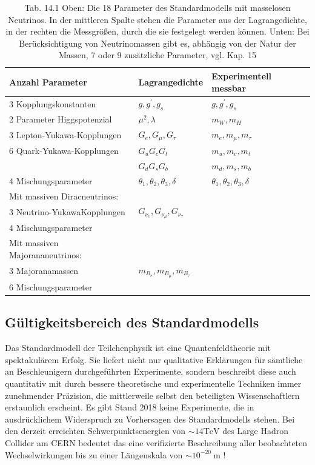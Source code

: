 \documentclass[10pt, letterpaper]{article}
\begin{document}
\begin{table}[h]
\begin{center}

\caption{Tab. 14.1 Oben: Die 18 Parameter des Standardmodells mit masselosen Neutrinos. In der mittleren Spalte stehen die Parameter aus der Lagrangedichte, in der rechten die Messgrößen, durch die sie festgelegt werden können. Unten: Bei Berücksichtigung von Neutrinomassen gibt es, abhängig von der Natur der Massen, 7 oder 9 zusätzliche Parameter, vgl. Kap. 15}
\begin{tabular}{|l|l|l|}
\hline
Anzahl Parameter & Lagrangedichte & Experimentell messbar \\
\hline
3 Kopplungskonstanten & $g, g^{\prime}, g_{s}$ & $g, g^{\prime}, g_{s}$ \\
\hline
2 Parameter Higgspotenzial & $\mu^{2}, \lambda$ & $m_{W}, m_{H}$ \\
\hline
3 Lepton-Yukawa-Kopplungen & $G_{e}, G_{\mu}, G_{\tau}$ & $m_{e}, m_{\mu}, m_{\tau}$ \\
\hline
6 Quark-Yukawa-Kopplungen & $G_{u} G_{c} G_{t}$ & $m_{u}, m_{c}, m_{t}$ \\
\hline
 & $G_{d} G_{s} G_{b}$ & $m_{d}, m_{s}, m_{b}$ \\
\hline
4 Mischungsparameter & $\theta_{1}, \theta_{2}, \theta_{3}, \delta$ & $\theta_{1}, \theta_{2}, \theta_{3}, \delta$ \\
\hline
Mit massiven Diracneutrinos: &  &  \\
\hline
3 Neutrino-YukawaKopplungen & $G_{\nu_{e}}, G_{\nu_{\mu}}, G_{\nu_{\tau}}$ &  \\
\hline
4 Mischungsparameter &  &  \\
\hline
Mit massiven Majorananeutrinos: &  &  \\
\hline
3 Majoranamassen & $m_{B_{e}}, m_{B_{\mu}}, m_{B_{\tau}}$ &  \\
\hline
6 Mischungsparameter &  &  \\
\hline
\end{tabular}
\end{center}
\end{table}

\subsection*{Gültigkeitsbereich des Standardmodells}
Das Standardmodell der Teilchenphysik ist eine Quantenfeldtheorie mit spektakulärem Erfolg. Sie liefert nicht nur qualitative Erklärungen für sämtliche an Beschleunigern durchgeführten Experimente, sondern beschreibt diese auch quantitativ mit durch bessere theoretische und experimentelle Techniken immer zunehmender Präzision, die mittlerweile selbst den beteiligten Wissenschaftlern erstaunlich erscheint. Es gibt Stand 2018 keine Experimente, die in ausdrücklichem Widerspruch zu Vorhersagen des Standardmodells stehen. Bei den derzeit erreichten Schwerpunktsenergien von $\sim 14 \mathrm{TeV}$ des Large Hadron Collider am CERN bedeutet das eine verifizierte Beschreibung aller beobachteten Wechselwirkungen bis zu einer Längenskala von $\sim 10^{-20} \mathrm{~m}$ !
\end{document}
